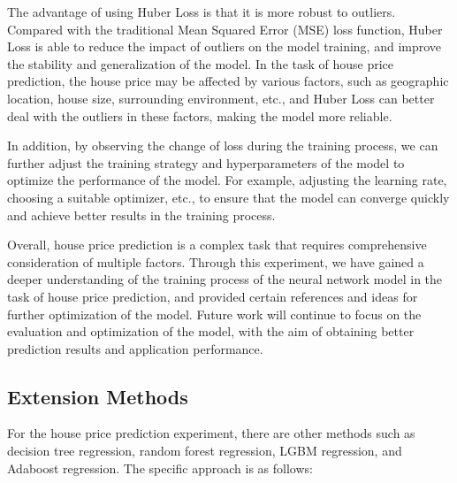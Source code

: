 \documentclass[a4paper,12pt]{article}
\begin{document}
The advantage of using Huber Loss is that it is more robust to outliers. Compared with the traditional Mean Squared Error (MSE) loss function, Huber Loss is able to reduce the impact of outliers on the model training, and improve the stability and generalization of the model. In the task of house price prediction, the house price may be affected by various factors, such as geographic location, house size, surrounding environment, etc., and Huber Loss can better deal with the outliers in these factors, making the model more reliable.

In addition, by observing the change of loss during the training process, we can further adjust the training strategy and hyperparameters of the model to optimize the performance of the model. For example, adjusting the learning rate, choosing a suitable optimizer, etc., to ensure that the model can converge quickly and achieve better results in the training process.

Overall, house price prediction is a complex task that requires comprehensive consideration of multiple factors. Through this experiment, we have gained a deeper understanding of the training process of the neural network model in the task of house price prediction, and provided certain references and ideas for further optimization of the model. Future work will continue to focus on the evaluation and optimization of the model, with the aim of obtaining better prediction results and application performance.

\subsection{Extension Methods}
For the house price prediction experiment, there are other methods such as decision tree regression, random forest regression, LGBM regression, and Adaboost regression. The specific approach is as follows:
\end{document}
